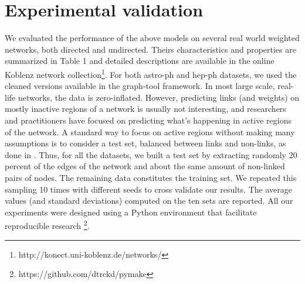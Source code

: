 \section{Experimental validation}
\label{sec:exps}

We evaluated the performance of the above models on several real world weighted networks, both directed and undirected. Theirs characteristics and properties are summarized in Table 1 and detailed descriptions are available in the online Koblenz network collection\footnote{http://konect.uni-koblenz.de/networks/}. For both astro-ph and hep-ph datasets, we used the cleaned versions available in the  graph-tool framework.
In most large scale, real-life networks, the data is zero-inflated. However, predicting links (and weights) on mostly inactive regions of a network is usually not interesting, and researchers and practitioners have focused on predicting what's happening in active regions of the network. A standard way to focus on active regions without making many assumptions is to consider a test set, balanced between links and non-links, as done in \cite{kim2013efficient}. 
 Thus, for all the datasets, we built a test set by extracting randomly 20 percent of the edges of the network and about the same amount of non-linked pairs of nodes.
 The remaining data constitutes the training set. We repeated this sampling 10 times with different seeds to cross validate our results. The average values (and standard deviations) computed on the ten sets are reported. 
All our experiments were designed using a Python environment that facilitate reproducible research \footnote{https://github.com/dtrckd/pymake}.

